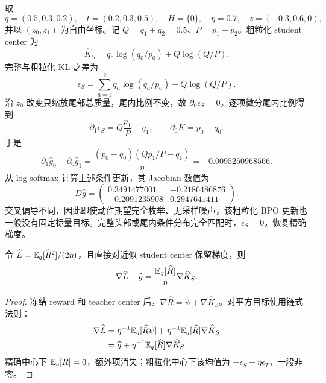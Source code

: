 \begin{example}
\label{opd:curl-example}
取
\begin{equation}
q=(0.5,0.3,0.2),\quad t=(0.2,0.3,0.5),\quad H=\{0\},\quad
\eta=0.7,\quad z=(-0.3,0.6,0),
\end{equation}
并以 $(z_0,z_1)$ 为自由坐标。记 $Q=q_1+q_2=0.5$、$P=p_1+p_2$。粗粒化 student center 为
\begin{equation}
\widehat K_S=q_0\log(q_0/p_0)+Q\log(Q/P).
\end{equation}
完整与粗粒化 KL 之差为
\begin{equation}
\epsilon_S=\sum_{a=1}^2q_a\log(q_a/p_a)-Q\log(Q/P).
\end{equation}
沿 $z_0$ 改变只缩放尾部总质量，尾内比例不变，故 $\partial_0\epsilon_S=0$。逐项微分尾内比例得到
\begin{equation}
\partial_1\epsilon_S=Q\frac{p_1}{P}-q_1,\qquad
\partial_0K=p_0-q_0.
\end{equation}
于是
\begin{equation}
\partial_1\widehat g_0-\partial_0\widehat g_1
=\frac{(p_0-q_0)(Qp_1/P-q_1)}{\eta}
=-0.0095250968566.
\end{equation}
从 log-softmax 计算上述条件更新，其 Jacobian 数值为
\begin{equation}
D\widehat g=
\begin{pmatrix}
0.3491477001&-0.2186486876\\
-0.2091235908&0.2947641411
\end{pmatrix}.
\end{equation}
交叉偏导不同，因此即使动作期望完全枚举、无采样噪声，该粗粒化 BPO 更新也一般没有固定标量目标。完整头部或尾内条件分布完全匹配时，$\epsilon_S=0$，恢复精确梯度。
\end{example}

\begin{proposition}
\label{opd:approximate-square}
令 $\widehat L=\mathbb E_q[\widehat R^2]/(2\eta)$，且直接对近似 student center 保留梯度，则
\begin{equation}
\nabla\widehat L-\widehat g
=\frac{\mathbb E_q[\widehat R]}{\eta}\nabla\widehat K_S.
\end{equation}
\end{proposition}
\begin{proof}
冻结 reward 和 teacher center 后，$\nabla\widehat R=\psi+\nabla\widehat K_S$。对平方目标使用链式法则：
\begin{align}
\nabla\widehat L
&=\eta^{-1}\mathbb E_q[\widehat R\psi]
+\eta^{-1}\mathbb E_q[\widehat R]\nabla\widehat K_S\\
&=\widehat g+\eta^{-1}\mathbb E_q[\widehat R]\nabla\widehat K_S.
\end{align}
精确中心下 $\mathbb E_q[R]=0$，额外项消失；粗粒化中心下该均值为 $-\epsilon_S+\eta\epsilon_T$，一般非零。
\end{proof}

